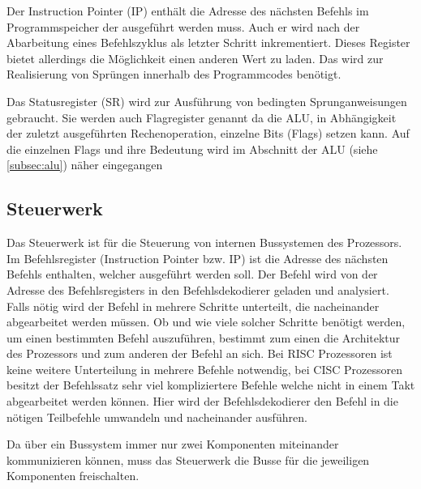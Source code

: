 \documentclass[12pt]{article}
\begin{document}
\par \bigskip
\noindent Der Instruction Pointer (IP) enthält die Adresse des nächsten Befehls im Programmspeicher der ausgeführt werden muss. Auch er wird nach der Abarbeitung eines Befehlszyklus als letzter Schritt inkrementiert. Dieses Register bietet allerdings die Möglichkeit einen anderen Wert zu laden. Das wird zur Realisierung von Sprüngen innerhalb des Programmcodes benötigt. 

\par \bigskip
\noindent Das Statusregister (SR) wird zur Ausführung von bedingten Sprunganweisungen gebraucht. Sie werden auch Flagregister genannt da die ALU, in Abhängigkeit der zuletzt ausgeführten Rechenoperation, einzelne Bits (Flags) setzen kann. Auf die einzelnen Flags und ihre Bedeutung wird im Abschnitt der ALU (siehe \ref{subsec:alu}) näher eingegangen

\subsection{Steuerwerk}
Das Steuerwerk ist für die Steuerung von internen Bussystemen des Prozessors. Im Befehlsregister (Instruction Pointer bzw. IP) ist die Adresse des nächsten Befehls enthalten, welcher ausgeführt werden soll. Der Befehl wird von der Adresse des Befehlsregisters in den Befehlsdekodierer geladen und analysiert. Falls nötig wird der Befehl in mehrere Schritte unterteilt, die nacheinander abgearbeitet werden müssen. Ob und wie viele solcher Schritte benötigt werden, um einen bestimmten Befehl auszuführen, bestimmt zum einen die Architektur des Prozessors und zum anderen der Befehl an sich. Bei RISC Prozessoren ist keine weitere Unterteilung in mehrere Befehle notwendig, bei CISC Prozessoren besitzt der Befehlssatz sehr viel kompliziertere Befehle welche nicht in einem Takt abgearbeitet werden können. Hier wird der Befehlsdekodierer den Befehl in die nötigen Teilbefehle umwandeln und nacheinander ausführen.

\par\smallskip\noindent Da über ein Bussystem immer nur zwei Komponenten miteinander kommunizieren können, muss das Steuerwerk die Busse für die jeweiligen Komponenten freischalten. 
\end{document}
